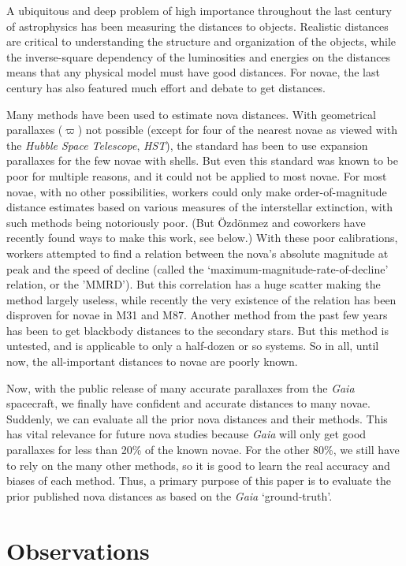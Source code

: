 \documentclass[a4paper,fleqn,usenatbib]{mnras}
\begin{document}
A ubiquitous and deep problem of high importance throughout the last century of astrophysics has been measuring the distances to objects.  Realistic distances are critical to understanding the structure and organization of the objects, while the inverse-square dependency of the luminosities and energies on the distances means that any physical model must have good distances.  For novae, the last century has also featured much effort and debate to get distances.  

Many methods have been used to estimate nova distances.  With geometrical parallaxes ($\varpi$)
 not possible (except for four of the nearest novae as viewed with the {\it Hubble Space Telescope}, {\it HST}), the standard has been to use expansion parallaxes for the few novae with shells.  But even this standard was known to be poor for multiple reasons, and it could not be applied to most novae.  For most novae, with no other possibilities, workers could only make order-of-magnitude distance estimates based on various measures of the interstellar extinction, with such methods being notoriously poor.  (But \"{O}zd\"{o}nmez and coworkers have recently found ways to make this work, see below.)  With these poor calibrations, workers attempted to find a relation between the nova's absolute magnitude at peak and the speed of decline (called the `maximum-magnitude-rate-of-decline' relation, or the 'MMRD').  But this correlation has a huge scatter making the method largely useless, while recently the very existence of the relation has been disproven for novae in M31 and M87.  Another method from the past few years has been to get blackbody distances to the secondary stars.  But this method is untested, and is applicable to only a half-dozen or so systems.  So in all, until now, the all-important distances to novae are poorly known.

Now, with the public release of many accurate parallaxes from the {\it Gaia} spacecraft, we finally have confident and accurate distances to many novae.  Suddenly, we can evaluate all the prior nova distances and their methods.  This has vital relevance for future nova studies because {\it Gaia} will only get good parallaxes for less than 20\% of the known novae.  For the other 80\%, we still have to rely on the many other methods, so it is good to learn the real accuracy and biases of each method.  Thus, a primary purpose of this paper is to evaluate the prior published nova distances as based on the {\it Gaia} `ground-truth'.  

\section{Observations}
\end{document}
